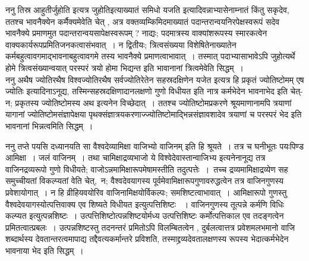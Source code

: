 \documentclass[11pt, openany]{book}
\begin{document}
 {\br ननु} {\qt तिस्र आहुतीर्जुहोति} इत्यत्र {\qt जुहोति}इत्याख्यातं {\qt समिधो यजति} इत्यादिवन्नाभ्यासेनाम्नातं किंतु सकृदेव, ततश्च भावनैक्येन कर्मैक्यमेवेति
चेत् , अत्र वक्तव्यम्\textendash किमिदमाख्यातं पदान्तरान्वयनिरपेक्षस्वरूपं सदेव भावनैक्ये प्रमाणमुत पदान्तरान्वयसापेक्षस्वरूपम् ? नाद्यः; पदमात्रस्य
वाक्यांशरूपस्य स्मारकत्वेन वाक्यकार्यरूपप्रमितिजनकत्वासंभवात्~। न द्वितीयः; त्रित्वसंख्यया विशेषितेनाख्यातेन कर्मबहुत्वावगमाद्भावनाबहुत्वावगमे तस्य भावनैक्ये प्रमाणत्वाभावात्~। तस्मात् पदाभ्यासाभावेऽपि जुहोत्यर्थे होमे त्रित्वसंख्यान्वयात् परस्परं त्रयो होमा भिद्यन्त इति भावानानां त्रित्वमेवेति सिद्धम्~।\\

 {\br ननु} {\qt अथैष ज्योतिरथैष विश्वज्योतिरथैष सर्वज्योतिरेतेन सहस्रदक्षिणेन यजेत} इत्यत्र हि प्रकृतं ज्योतिष्टोमम् {\qt एष ज्योतिः} इत्यादिनाऽनूद्य, तस्मिन्सहस्रदक्षिणादानलक्षणो गुणो विधीयत इति नात्र कर्मभेदेन भावनाभेद इति चेत्- न; प्रकृतस्य ज्योतिष्टोमस्य {\qt अथ} इत्यनेन विच्छेदात्~। ततश्च ज्योतिष्टोमप्रकरणे श्रूयमाणानामपि त्रयाणां यागानां ज्योतिष्टोमसंज्ञापेक्षया पृथक्संज्ञात्रयकरणाज्ज्योतिष्टोमाद्भिन्नसंज्ञावशादेव त्रयाणां च परस्परं भेद इति भावनानां भिन्नत्वमिति सिद्धम्~।
\newpage
\fancyhead[RE]{[आर्थीभावनाया अंशत्रयम्]}

{\br ननु} {\qt तप्ते पयसि दध्यानयति सा वैश्वदेव्यामिक्षा वाजिभ्यो वाजिनम्} इति हि श्रूयते~। तत्र च घनीभूतः पयःपिण्ड आमिक्षा~। जलं वाजिनम्~। तथा चामिक्षाद्रव्यभाजो ये विश्वेदेवास्तान्वाजिभ्य इत्यनेनानूद्य तत्र {\qt वाजिन}द्रव्यरूपो गुणो विधीयते; वाजोऽन्नमामिक्षारूपमेषामस्तीति तदुत्पत्तेः~।\footnotemark\ तच्च द्रव्यमामिक्षाद्रव्येण सह समुच्चीयतां विकल्प्यतां वेति चेत्,\textemdash\ न; वैश्वदेवयागस्य पूर्वमेवामिक्षारूपगुणावरुद्धत्वेन तत्र वाजिनगुणस्य प्रवेशायोगात्~। न हि व्रीहियवयोरिव वाजिनामिक्षयोर्विकल्पः; समशिष्टत्वाभावात्~। आमिक्षारूपो गुणस्तु वैश्वदेवयागस्योत्पत्तिवाक्य एव शिष्यते विधीयत इत्युत्पत्तिशिष्टः ~। वाजिनगुणस्य तूत्पन्ने कर्मणि विधिः कल्प्यत इत्युत्पन्नशिष्टः~। उत्पत्तिशिष्टोत्पन्नशिष्टयोर्मध्य उत्पत्तिशिष्टः कर्मोत्पत्तिकाल एव तदङ्गत्वेन प्रमितत्वात्प्रबलः~। उत्पन्नशिष्टस्तु तदनन्तरं प्रमितोऽपि विलम्बितत्वेन , दुर्बलत्वात्तत्र प्रवेशमलभमानो {\qt वाजि} शब्दार्थस्य देवतान्तरत्वमापाद्य तद्दैवत्यकर्मान्तरे प्रविशति, तस्माद्द्रव्यदेवतालक्षणस्य रूपस्य भेदात्कर्मभेदेन भावनाया भेद इति
सिद्धम्~।\\
\end{document}
